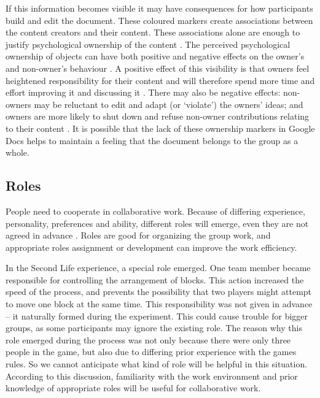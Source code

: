 \documentclass{acm_proc_article-sp}
\begin{document}
If this information becomes visible it may have consequences for how participants build and edit the document. These coloured markers create associations between the content creators and their content. These associations alone are enough to justify psychological ownership of the content \cite{begganassociation1994}. The perceived psychological ownership of objects can have both positive and negative effects on the owner's and non-owner's behaviour \cite{beggan1992social}. A positive effect of this visibility is that owners feel heightened responsibility for their content and will therefore spend more time and effort improving it and discussing it \cite{thom-santelliwhats2009}. There may also be negative effects: non-owners may be reluctant to edit and adapt (or `violate') the owners' ideas; and owners are more likely to shut down and refuse non-owner contributions relating to their content \cite{thom-santelliwhat2010}. It is possible that the lack of these ownership markers in Google Docs helps to maintain a feeling that the document belongs to the group as a whole.

\subsection{Roles}

People need to cooperate in collaborative work. Because of differing experience, personality, preferences and ability, different roles will emerge, even they are not agreed in advance \cite{barlow2013emergent}. Roles are good for organizing the group work, and appropriate roles assignment or development can improve the work efficiency.
 
In the Second Life experience, a special role emerged. One team member became responsible for controlling the arrangement of blocks. This action increased the speed of the process, and prevents the possibility that two players might attempt to move one block at the same time. This responsibility was not given in advance -- it naturally formed during the experiment. This could cause trouble for bigger groups, as some participants may ignore the existing role. The reason why this role emerged during the process was not only because there were only three people in the game, but also due to differing prior experience with the games rules. So we cannot anticipate what kind of role will be helpful in this situation. According to this discussion, familiarity with the work environment and prior knowledge of appropriate roles will be useful for collaborative work.
\end{document}
